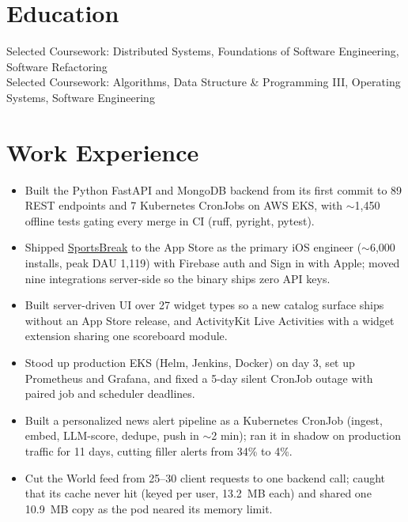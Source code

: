 \documentclass[11pt, letterpaper]{article}
\begin{document}

\section{Education}
Selected Coursework: Distributed Systems, Foundations of Software Engineering, Software Refactoring\\[1pt]
Selected Coursework: Algorithms, Data Structure \& Programming III, Operating Systems, Software Engineering

\section{Work Experience}
\begin{itemize}
  \item Built the Python FastAPI and MongoDB backend from its first commit to 89 REST endpoints and 7 Kubernetes CronJobs on AWS EKS, with $\sim$1{,}450 offline tests gating every merge in CI (ruff, pyright, pytest).
  \item Shipped \href{https://apps.apple.com/app/id6762649287}{SportsBreak} to the App Store as the primary iOS engineer ($\sim$6{,}000 installs, peak DAU 1{,}119) with Firebase auth and Sign in with Apple; moved nine integrations server-side so the binary ships zero API keys.
  \item Built server-driven UI over 27 widget types so a new catalog surface ships without an App Store release, and ActivityKit Live Activities with a widget extension sharing one scoreboard module.
  \item Stood up production EKS (Helm, Jenkins, Docker) on day 3, set up Prometheus and Grafana, and fixed a 5-day silent CronJob outage with paired job and scheduler deadlines.
  \item Built a personalized news alert pipeline as a Kubernetes CronJob (ingest, embed, LLM-score, dedupe, push in $\sim$2 min); ran it in shadow on production traffic for 11 days, cutting filler alerts from 34\% to 4\%.
  \item Cut the World feed from 25--30 client requests to one backend call; caught that its cache never hit (keyed per user, 13.2~MB each) and shared one 10.9~MB copy as the pod neared its memory limit.
\end{itemize}
\end{document}
